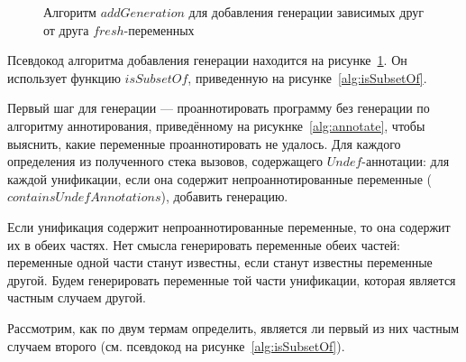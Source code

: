\begin{figure}[h!]
  \begin{center}
  \begin{minipage}{1.1\textwidth}
\begin{algorithm}[H]
\end{algorithm}
  \end{minipage}
  \end{center}
  \caption{Алгоритм $addGeneration$ для добавления генерации зависимых друг от друга $fresh$-переменных}
  \label{alg:addGeneration}
\end{figure}

Псевдокод алгоритма добавления генерации находится на рисунке~\ref{alg:addGeneration}.
Он использует функцию $isSubsetOf$, приведенную на рисунке~\ref{alg:isSubsetOf}.

Первый шаг для генерации --- проаннотировать программу без генерации по алгоритму аннотирования, приведённому на рисукнке~\ref{alg:annotate}, чтобы выяснить, какие переменные проаннотировать не удалось.
Для каждого определения из полученного стека вызовов, содержащего $Undef$-аннотации: для каждой унификации, если она содержит непроаннотированные переменные ($containsUndefAnnotations$), добавить генерацию.

Если унификация содержит непроаннотированные переменные, то она содержит их в обеих частях.
Нет смысла генерировать переменные обеих частей: переменные одной части станут известны, если станут известны переменные другой.
Будем генерировать переменные той части унификации, которая является частным случаем другой.

Рассмотрим, как по двум термам определить, является ли первый из них частным случаем второго (см. псевдокод на рисунке~\ref{alg:isSubsetOf}).


